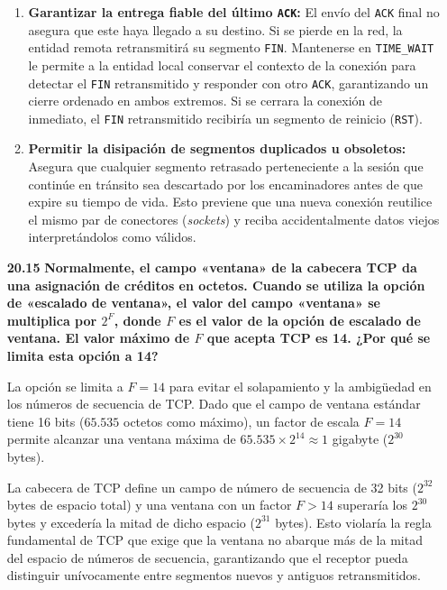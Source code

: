\documentclass[11pt,a4paper]{article}
\begin{document}
\begin{enumerate}
\begin{enumerate}
    \item \textbf{Garantizar la entrega fiable del último \texttt{ACK}:} 
    El envío del \texttt{ACK} final no asegura que este haya llegado a su destino. Si se pierde en la red, la entidad remota retransmitirá su segmento \texttt{FIN}. Mantenerse en \texttt{TIME\_WAIT} le permite a la entidad local conservar el contexto de la conexión para detectar el \texttt{FIN} retransmitido y responder con otro \texttt{ACK}, garantizando un cierre ordenado en ambos extremos. Si se cerrara la conexión de inmediato, el \texttt{FIN} retransmitido recibiría un segmento de reinicio (\texttt{RST}).

    \item \textbf{Permitir la disipación de segmentos duplicados u obsoletos:} 
    Asegura que cualquier segmento retrasado perteneciente a la sesión que continúe en tránsito sea descartado por los encaminadores antes de que expire su tiempo de vida. Esto previene que una nueva conexión reutilice el mismo par de conectores (\textit{sockets}) y reciba accidentalmente datos viejos interpretándolos como válidos.
\end{enumerate}

    \item[\textbf{20.15}] \textbf{Normalmente, el campo «ventana» de la cabecera TCP da una asignación de créditos en octetos. Cuando se utiliza la opción de «escalado de ventana», el valor del campo «ventana» se multiplica por $2^F$, donde $F$ es el valor de la opción de escalado de ventana. El valor máximo de $F$ que acepta TCP es 14. ¿Por qué se limita esta opción a 14?}

    La opción se limita a $F = 14$ para evitar el solapamiento y la ambigüedad en los números de secuencia de TCP. Dado que el campo de ventana estándar tiene 16 bits ($65.535$ octetos como máximo), un factor de escala $F = 14$ permite alcanzar una ventana máxima de $65.535 \times 2^{14} \approx 1$ gigabyte ($2^{30}$ bytes).

La cabecera de TCP define un campo de número de secuencia de 32 bits ($2^{32}$ bytes de espacio total) y una ventana con un factor $F > 14$ superaría los $2^{30}$ bytes y excedería la mitad de dicho espacio ($2^{31}$ bytes). Esto violaría la regla fundamental de TCP que exige que la ventana no abarque más de la mitad del espacio de números de secuencia, garantizando que el receptor pueda distinguir unívocamente entre segmentos nuevos y antiguos retransmitidos.
\end{enumerate}
\end{document}
